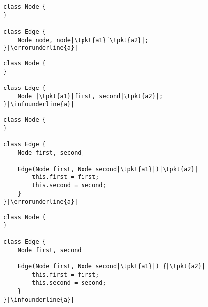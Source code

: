 \newcommand{\featuremodule}[1]{\hfill#1~~~}

\newcommand{\centeredlisting}[1]{
	\begin{center}
		\begin{tikzpicture}[every node/.style={rounded corners,draw,thick,fill=white},listing/.style={inner xsep=4pt,inner ysep=3pt}]
			\node[listing] at (0,0) {\makebox{\usebox{#1}}};
		\end{tikzpicture}
	\end{center}
}


\newsavebox{\edgelexicalerror}
\begin{lrbox}{\edgelexicalerror}
	\begin{lstlisting}
class Node {
}

class Edge {
	Node node, node|\tpkt{a1}´\tpkt{a2}|;
}|\errorunderline{a}|
	\end{lstlisting}
\end{lrbox}

\newsavebox{\edgelexicalerrorfix}
\begin{lrbox}{\edgelexicalerrorfix}
	\begin{lstlisting}
class Node {
}

class Edge {
	Node |\tpkt{a1}|first, second|\tpkt{a2}|;
}|\infounderline{a}|
	\end{lstlisting}
\end{lrbox}

\newsavebox{\edgesyntaxerror}
\begin{lrbox}{\edgesyntaxerror}
	\begin{lstlisting}
class Node {
}

class Edge {
	Node first, second;

	Edge(Node first, Node second|\tpkt{a1}|)|\tpkt{a2}|
		this.first = first;
		this.second = second;
	}
}|\errorunderline{a}|
	\end{lstlisting}
\end{lrbox}

\newsavebox{\edgesyntaxerrorfix}
\begin{lrbox}{\edgesyntaxerrorfix}
	\begin{lstlisting}
class Node {
}

class Edge {
	Node first, second;

	Edge(Node first, Node second|\tpkt{a1}|) {|\tpkt{a2}|
		this.first = first;
		this.second = second;
	}
}|\infounderline{a}|
	\end{lstlisting}
\end{lrbox}

